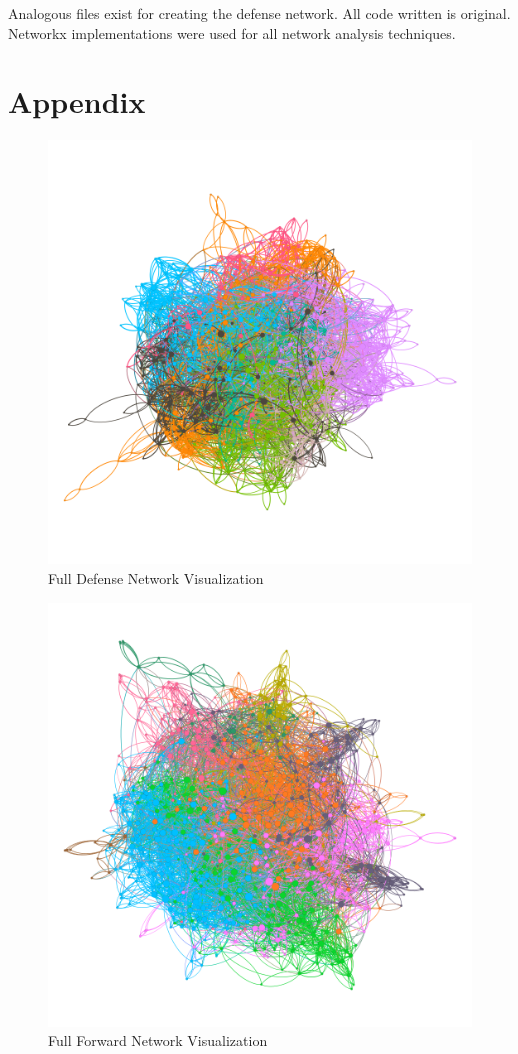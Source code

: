 \documentclass{article}
\begin{document}
Analogous files exist for creating the defense network.
All code written is original.
Networkx implementations were used for all network analysis techniques.


\newpage
\section{Appendix}
\begin{figure}[H]
\centering
\includegraphics[scale=0.45]{images/defense.png}
\caption{Full Defense Network Visualization}
\label{vis1}
\end{figure}

\begin{figure}[H]
\centering
\includegraphics[scale=0.45]{images/forwards.png}
\caption{Full Forward Network Visualization}
\label{vis2}
\end{figure}
\end{document}
